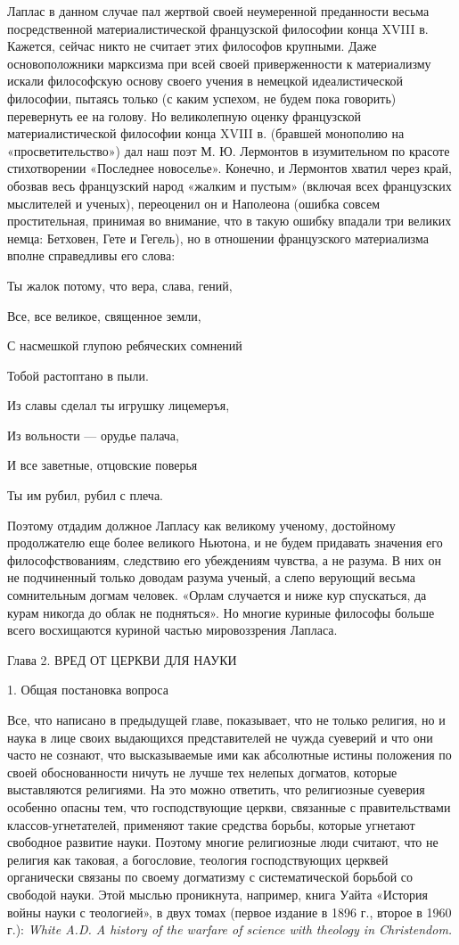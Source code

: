 Лаплас в данном случае пал жертвой своей неумеренной преданности весьма
посредственной материалистической французской философии конца XVIII в.
Кажется, сейчас никто не считает этих философов крупными. Даже
основоположники марксизма при всей своей приверженности к материализму
искали философскую основу своего учения в немецкой идеалистической
философии, пытаясь только (с каким успехом, не будем пока говорить)
перевернуть ее на голову. Но великолепную оценку французской
материалистической философии конца XVIII в. (бравшей монополию на
«просветительство») дал наш поэт М. Ю. Лермонтов в изумительном по красоте
стихотворении «Последнее новоселье». Конечно, и Лермонтов хватил через
край, обозвав весь французский народ «жалким и пустым» (включая всех
французских мыслителей и ученых), переоценил он и Наполеона (ошибка совсем
простительная, принимая во внимание, что в такую ошибку впадали три великих
немца: Бетховен, Гете и Гегель), но в отношении французского материализма
вполне справедливы его слова:

Ты жалок потому, что вера, слава, гений,

Все, все великое, священное земли,

С насмешкой глупою ребяческих сомнений

Тобой растоптано в пыли.

Из славы сделал ты игрушку лицемеръя,

Из вольности --- орудье палача,

И все заветные, отцовские поверья

Ты им рубил, рубил с плеча.

Поэтому отдадим должное Лапласу как великому ученому, достойному
продолжателю еще более великого Ньютона, и не будем придавать значения его
философствованиям, следствию его убеждениям чувства,
а не разума. В них он не подчиненный только доводам разума ученый, а слепо
верующий весьма сомнительным догмам человек. «Орлам случается и ниже кур
спускаться, да курам никогда до облак не подняться». Но многие куриные
философы больше всего восхищаются куриной частью мировоззрения Лапласа.

Глава 2. ВРЕД ОТ ЦЕРКВИ ДЛЯ НАУКИ

1. Общая постановка вопроса

Все, что написано в предыдущей главе, показывает, что не только религия, но и
наука в лице своих выдающихся представителей не чужда суеверий и что они часто
не сознают, что высказываемые ими как абсолютные истины положения по своей
обоснованности ничуть не лучше тех нелепых догматов, которые выставляются
религиями. На это можно ответить, что религиозные суеверия особенно опасны тем,
что господствующие церкви, связанные с правительствами классов-угнетателей,
применяют такие средства борьбы, которые угнетают свободное развитие науки.
Поэтому многие религиозные люди считают, что не религия как таковая, а
богословие, теология господствующих церквей органически связаны по своему
догматизму с систематической борьбой со свободой науки. Этой мыслью проникнута,
например, книга Уайта «История войны науки с теологией», в двух томах (первое
издание в 1896 г., второе в 1960 г.): \emph{White A.D. A history of the
warfare of science with theology in Christendom.}

